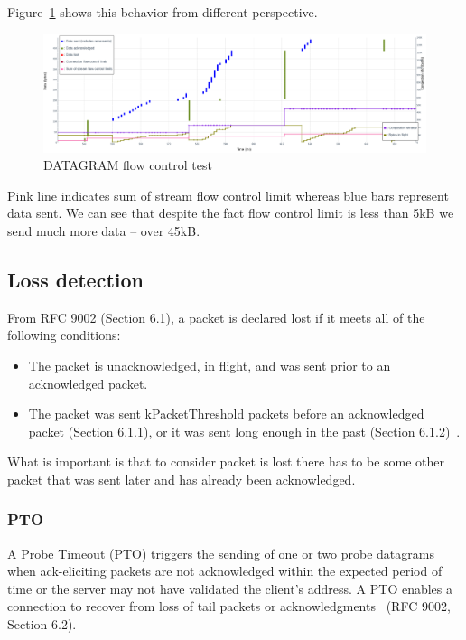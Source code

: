 Figure~\ref{fig:dgram_flow_control2} shows this behavior from different perspective.
\begin{figure}
    \centering
    \includegraphics[width=\textwidth]{img/__09__datagrams/dgram_flow_control_2.png}
    \caption{DATAGRAM flow control test}
    \label{fig:dgram_flow_control2}
\end{figure}
Pink line indicates sum of stream flow control limit whereas blue bars represent data sent.
We can see that despite the fact flow control limit is less than 5kB we send much more data -- over 45kB\@.

\subsection{Loss detection}
\label{subsec:loss-detection}
From RFC 9002 (Section 6.1), a packet is declared lost if it meets all of the following conditions:
\begin{itemize}
    \item The packet is unacknowledged, in flight, and was sent prior to an acknowledged packet.
    \item The packet was sent kPacketThreshold packets before an acknowledged packet (Section 6.1.1), or it was sent long enough in the past (Section 6.1.2)~\cite{rfc9002}.
\end{itemize}

What is important is that to consider packet is lost there has to be some other packet that was sent later and has already been acknowledged.

\subsubsection{PTO}
A Probe Timeout (PTO) triggers the sending of one or two probe datagrams when ack-eliciting packets are not acknowledged within the expected period of time or the server may not have validated the client's address.
A PTO enables a connection to recover from loss of tail packets or acknowledgments~\cite{rfc9002} (RFC 9002, Section 6.2).

